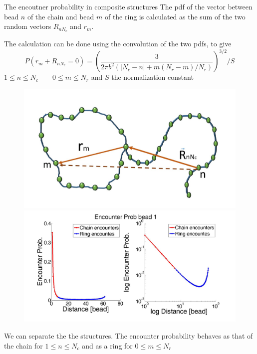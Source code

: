 \documentclass[8pt]{beamer}
\begin{document}
\begin{frame}{The encoutner probability in composite structures}
The pdf of the vector between bead $n$ of the chain and bead $m$ of the ring is calculated as the sum of the two random vectors $R_{nN_c}$ and $r_m$. 

The calculation can be done using the convolution of the two pdfs, to give
\begin{equation*}
P(r_m+R_{nN_c}=0)=\left(\frac{3}{2\pi b^2(|N_c-n|+m(N_r-m)/N_r)}\right)^{3/2}/S
\end{equation*}
$1\leq n \leq N_c \qquad 0\leq m \leq N_r$ and $S$ the normalization constant 
\begin{figure}
\includegraphics[scale=0.13]{rouseChainAndRingVectorBetweenBeads}
\includegraphics[scale=0.09]{chainRingEncounterTheoreticalProb}
\end{figure}
We can separate the the structures. 
The encounter probability behaves as that of the chain for $1\leq n \leq N_c$ and as a ring for $0\leq m \leq N_r$
\end{frame}
\end{document}
